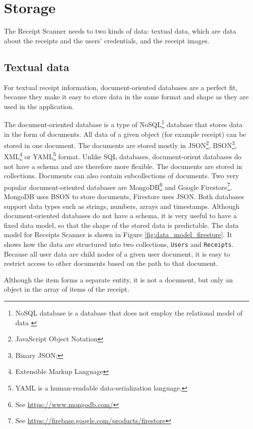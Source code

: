 \documentclass[
  digital, %
  table,   %
  oneside, %
  lof,     %
  lot,     %
]{fithesis3}
\begin{document}
\section{Storage}
The Receipt Scanner needs to two kinds of data: textual data, which are data about the receipts and the users' credentials, and the receipt images. 

\subsection{Textual data}
For textual receipt information, document-oriented databases are a perfect fit, because they make it easy to store data in the same format and shape as they are used in the application. 

The document-oriented database is a type of NoSQL\footnote{NoSQL database is a database that does not employ the relational model of data \cite{DigitalOcean2019Database}} database that stores data in the form of documents. All data of a given object (for example receipt) can be stored in one document. The documents are stored mostly in JSON\footnote{JavaScript Object Notation}, BSON\footnote{Binary JSON;}, XML\footnote{Extensible Markup Language} or YAML\footnote{YAML is a human-readable data-serialization language.} format. Unlike SQL databases, document-orient databases do not have a schema and are therefore more flexible. 
The documents are stored in collections. Documents can also contain subcollections of documents.
Two very popular document-oriented databases are MongoDB\footnote{See \url{https://www.mongodb.com/}} and Google Firestore\footnote{See \url{https://firebase.google.com/products/firestore}}. MongoDB uses BSON to store documents, Firestore uses JSON. Both databases support data types such as strings, numbers, arrays and timestamps. 
Although document-oriented databases do not have a schema, it is very useful to have a fixed data model, so that the shape of the stored data is predictable. 
The data model for Receipts Scanner is shown in Figure \ref{fig:data_model_firestore}. It shows how the data are structured into two collections, \texttt{Users} and \texttt{Receipts}. Because all user data are child nodes of a given user document, it is easy to restrict access to other documents based on the path to that document.

Although the item forms a separate entity, it is not a document, but only an object in the array of items of the receipt.
\end{document}
